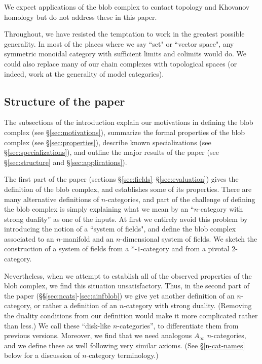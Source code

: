 We expect applications of the blob complex to contact topology and Khovanov homology 
but do not address these in this paper.

Throughout, we have resisted the temptation to work in the greatest possible generality.
In most of the places where we say ``set" or ``vector space", any symmetric monoidal category 
with sufficient limits and colimits would do.
We could also replace many of our chain complexes with topological spaces (or indeed, work at the generality of model categories).


\subsection{Structure of the paper}
The subsections of the introduction explain our motivations in defining the blob complex (see \S \ref{sec:motivations}), 
summarize the formal properties of the blob complex (see \S \ref{sec:properties}), describe known specializations (see \S \ref{sec:specializations}), and outline the major results of the paper (see \S \ref{sec:structure} and \S \ref{sec:applications}).

The first part of the paper (sections \S \ref{sec:fields}--\S \ref{sec:evaluation}) gives the definition of the blob complex, 
and establishes some of its properties.
There are many alternative definitions of $n$-categories, and part of the challenge of defining the blob complex is 
simply explaining what we mean by an ``$n$-category with strong duality'' as one of the inputs.
At first we entirely avoid this problem by introducing the notion of a ``system of fields", and define the blob complex 
associated to an $n$-manifold and an $n$-dimensional system of fields.
We sketch the construction of a system of fields from a *-$1$-category and from a pivotal $2$-category.

Nevertheless, when we attempt to establish all of the observed properties of the blob complex, 
we find this situation unsatisfactory.
Thus, in the second part of the paper (\S\S \ref{sec:ncats}-\ref{sec:ainfblob}) we give yet another 
definition of an $n$-category, or rather a definition of an $n$-category with strong duality.
(Removing the duality conditions from our definition would make it more complicated rather than less.) 
We call these ``disk-like $n$-categories'', to differentiate them from previous versions.
Moreover, we find that we need analogous $A_\infty$ $n$-categories, and we define these as well following very similar axioms.
(See \S \ref{n-cat-names} below for a discussion of $n$-category terminology.)

